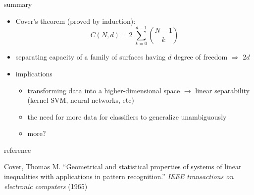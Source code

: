 \documentclass[aspectratio=169, 11pt, handout]{beamer}
\begin{document}
\begin{frame}{summary}
  \begin{itemize}[<+->]
  \item {Cover's theorem (proved by induction):
      \[
        C(N, d) = 2\;\sum\limits_{k=0}^{d-1} {N -1\choose k}
      \]
    }
  \item separating capacity of a family of surfaces having $d$ degree of freedom $\Rightarrow$ $2d$
  \item {implications
      \begin{itemize}
      \item transforming data into a higher-dimensional space $\rightarrow$ linear separability (kernel SVM, neural networks, etc)
      \item the need for more data for classifiers to generalize unambiguously
      \item more?
      \end{itemize}
    }
  \end{itemize}
\end{frame}

\begin{frame}{reference}
  \begin{centering}
    {\large
      Cover, Thomas M. ``Geometrical and statistical properties of systems of linear inequalities with applications in pattern recognition.'' \textit{IEEE transactions on electronic computers} (1965)
    }
  \end{centering}
\end{frame}
\end{document}

